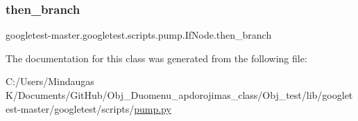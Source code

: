 \mbox{\label{classgoogletest-master_1_1googletest_1_1scripts_1_1pump_1_1_if_node_a7e69184ee75910795712a3ea61456463}} 
\subsubsection{\texorpdfstring{then\_branch}{then\_branch}}
{\footnotesize\ttfamily googletest-\/master.\+googletest.\+scripts.\+pump.\+If\+Node.\+then\+\_\+branch}



The documentation for this class was generated from the following file\+:\begin{DoxyCompactItemize}
\item 
C\+:/\+Users/\+Mindaugas K/\+Documents/\+Git\+Hub/\+Obj\+\_\+\+Duomenu\+\_\+apdorojimas\+\_\+class/\+Obj\+\_\+test/lib/googletest-\/master/googletest/scripts/\mbox{\hyperlink{_obj__test_2lib_2googletest-master_2googletest_2scripts_2pump_8py}{pump.\+py}}\end{DoxyCompactItemize}
